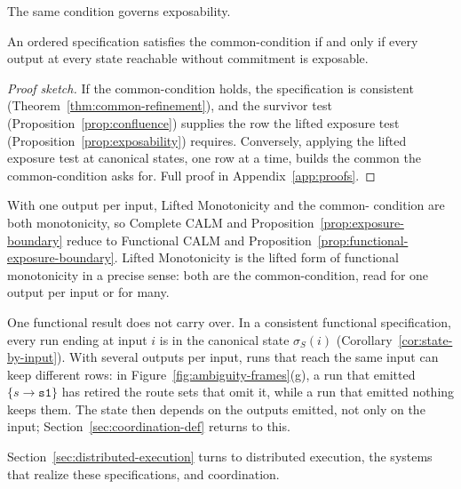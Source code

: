 The same condition governs exposability.

\begin{proposition}
\label{prop:exposure-boundary}
An ordered specification satisfies the common-\indesc condition if and only
if every output at every state reachable without commitment is exposable.
\end{proposition}

\begin{proof}[Proof sketch]
If the common-\indesc condition holds, the specification is consistent
(Theorem~\ref{thm:common-refinement}), and the survivor test
(Proposition~\ref{prop:confluence}) supplies the row the lifted exposure test
(Proposition~\ref{prop:exposability}) requires.  Conversely, applying the
lifted exposure test at canonical states, one row at a time, builds the common
\outnoun the common-\indesc condition asks for.  Full proof in
Appendix~\ref{app:proofs}.
\end{proof}

With one output per input, Lifted Monotonicity and the common-\indesc
condition are both monotonicity, so Complete CALM and
Proposition~\ref{prop:exposure-boundary} reduce to Functional CALM and
Proposition~\ref{prop:functional-exposure-boundary}.  Lifted Monotonicity is
the lifted form of functional monotonicity in a precise sense: both are the
common-\indesc condition, read for one output per input or for many.

One functional result does not carry over.  In a consistent functional
specification, every run ending at input $i$ is in the canonical state
$\sigma_S(i)$ (Corollary~\ref{cor:state-by-input}).  With several outputs per
input, runs that reach the same input can keep different rows: in
Figure~\ref{fig:ambiguity-frames}(g), a run that emitted
$\{s{\to}\texttt{s1}\}$ has retired the route sets that omit it, while a run
that emitted nothing keeps them.  The state then depends on the outputs
emitted, not only on the input; Section~\ref{sec:coordination-def} returns
to this.

Section~\ref{sec:distributed-execution} turns to distributed execution, the
systems that realize these specifications, and coordination.
